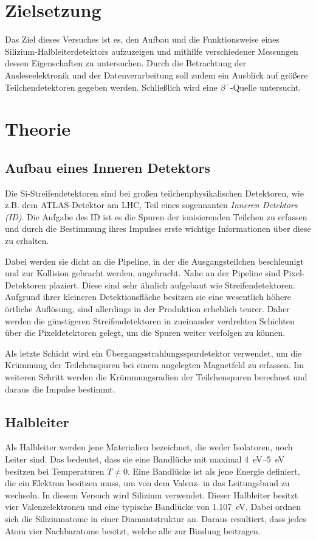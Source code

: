 \section{Zielsetzung}
\label{sec:Zielsetzung}

Das Ziel dieses Versuches ist es, den Aufbau und die Funktionsweise eines
Silizium-Halbleiterdetektors aufzuzeigen und mithilfe verschiedener Messungen dessen
Eigenschaften zu untersuchen. Durch die Betrachtung der Ausleseelektronik und
der Datenverarbeitung soll zudem ein Ausblick auf größere Teilchendetektoren
gegeben werden. Schließlich wird eine $\beta^{-}$-Quelle untersucht.

\section{Theorie}
\label{sec:Theorie}
\subsection{Aufbau eines Inneren Detektors}

Die Si-Streifendetektoren sind bei großen teilchenphysikalischen Detektoren,
wie z.B. dem ATLAS-Detektor am LHC, Teil eines sogennanten \textit{Inneren Detektors (ID)}.
Die Aufgabe des ID ist es die Spuren der ionisierenden Teilchen zu erfassen und
durch die Bestimmung ihres Impulses erste wichtige Informationen über diese zu
erhalten.

Dabei werden sie dicht an die Pipeline, in der die Ausgangsteilchen beschleunigt und
zur Kollision gebracht werden, angebracht. Nahe an der Pipeline sind Pixel-Detektoren plaziert.
Diese sind sehr ähnlich aufgebaut wie Streifendetektoren. Aufgrund ihrer kleineren
Detektionsfläche besitzen sie eine wesentlich höhere örtliche Auflösung, sind
allerdings in der Produktion erheblich teurer. Daher werden die günstigeren
Streifendetektoren in zueinander verdrehten Schichten über die Pixeldetektoren
gelegt, um die Spuren weiter verfolgen zu können.

Als letzte Schicht wird ein Übergangsstrahlungsspurdetektor verwendet, um die
Krümmung der Teilchenspuren bei einem angelegten Magnetfeld zu
erfassen. Im weiteren Schritt werden die Krümmungsradien der Teilchenspuren
berechnet und daraus die Impulse bestimmt.

\subsection{Halbleiter}
\label{sec:Halbleiter-Theorie}
Als Halbleiter werden jene Materialien bezeichnet, die weder Isolatoren, noch Leiter
sind. Das bedeutet, dass sie eine Bandlücke mit maximal \SIrange{4}{5}{\electronvolt}
besitzen bei Temperaturen $T \neq 0$. Eine Bandlücke ist
als jene Energie definiert, die ein Elektron besitzen muss, um von dem Valenz-
in das Leitungsband zu wechseln.
In diesem Versuch wird Silizium verwendet. Dieser Halbleiter besitzt vier
Valenzelektronen und eine typische Bandlücke von \SI{1.107}{\electronvolt}.
Dabei ordnen sich die Siliziumatome in einer Diamantstruktur an. Daraus
resultiert, dass jedes Atom vier Nachbaratome besitzt, welche alle zur Bindung
beitragen.

